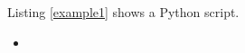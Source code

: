 \documentclass{article}
\newcommand{\pythonscript}[2]{
\begin{itemize}
\item[]
\end{itemize}
}
\begin{document}

% 
% 
% 
% 
% 
% 
% 
% 
\begin{homeworkTask}
Listing \ref{example1} shows a Python script.

\pythonscript{example1}{Sample Python Script With Highlighting}

\lipsum[1]
\end{homeworkTask}
\end{document}
